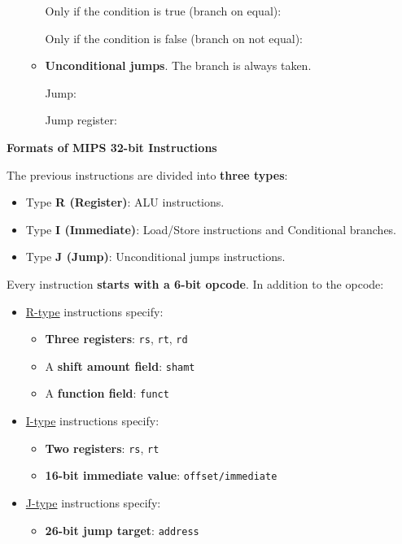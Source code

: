 \begin{itemize}
\begin{itemize}
        Only if the condition is true (branch on equal):
        
        
        Only if the condition is false (branch on not equal):
        


        \item \textbf{Unconditional jumps}. The branch is always taken.

        Jump:
        

        Jump register:
        
    \end{itemize}
\end{itemize}

\newpage

\begin{center}
    \large
    \textcolor{Red3}{\textbf{Formats of MIPS 32-bit Instructions}}
\end{center}
The previous instructions are divided into \textbf{three types}: 
\begin{itemize}
    \item Type \textbf{R (Register)}: ALU instructions.

    \item Type \textbf{I (Immediate)}: Load/Store instructions and Conditional branches.
    
    \item Type \textbf{J (Jump)}: Unconditional jumps instructions.
\end{itemize}
Every instruction \textbf{starts with a 6-bit opcode}. In addition to the opcode:
\begin{itemize}
    \item \underline{R-type} instructions specify:
    \begin{itemize}
        \item \textbf{Three registers}: \texttt{rs}, \texttt{rt}, \texttt{rd}
        \item A \textbf{shift amount field}: \texttt{shamt}
        \item A \textbf{function field}: \texttt{funct}
    \end{itemize}

    \item \underline{I-type} instructions specify:
    \begin{itemize}
        \item \textbf{Two registers}: \texttt{rs}, \texttt{rt}
        \item \textbf{16-bit immediate value}: \texttt{offset/immediate}
    \end{itemize}

    \item \underline{J-type} instructions specify: 
    \begin{itemize}
        \item \textbf{26-bit jump target}: \texttt{address}
    \end{itemize}
\end{itemize}

